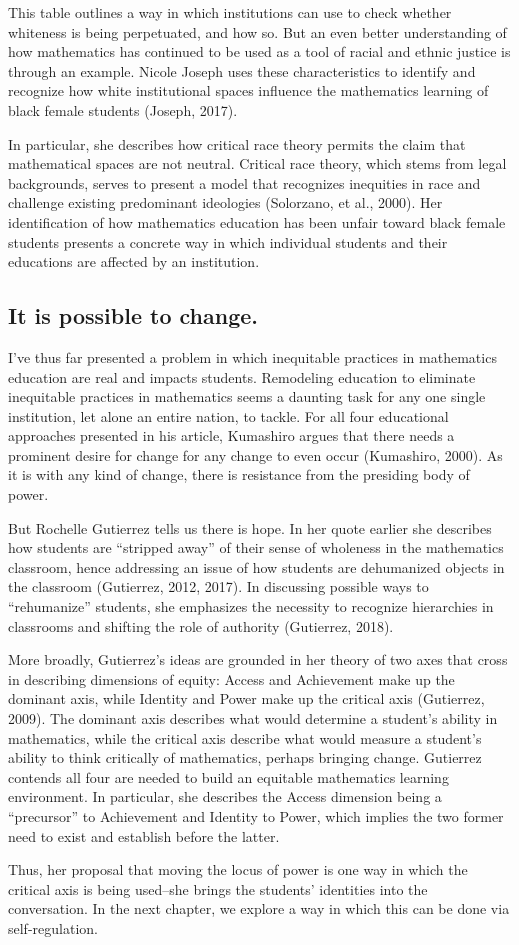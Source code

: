 This table outlines a way in which institutions can use to check whether whiteness is being perpetuated, and how so. But an even better understanding of how mathematics has continued to be used as a tool of racial and ethnic justice is through an example. Nicole Joseph uses these characteristics to identify and recognize how white institutional spaces influence the mathematics learning of black female students (Joseph, 2017).

In particular, she describes how critical race theory permits the claim that mathematical spaces are not neutral. Critical race theory, which stems from legal backgrounds, serves to present a model that recognizes inequities in race and challenge existing predominant ideologies (Solorzano, et al., 2000). Her identification of how mathematics education has been unfair toward black female students presents a concrete way in which individual students and their educations are affected by an institution.

\subsection{It is possible to change.}
I've thus far presented a problem in which inequitable practices in mathematics education are real and impacts students. Remodeling education to eliminate inequitable practices in mathematics seems a daunting task for any one single institution, let alone an entire nation, to tackle. For all four educational approaches presented in his article, Kumashiro argues that there needs a prominent desire for change for any change to even occur (Kumashiro, 2000). As it is with any kind of change, there is resistance from the presiding body of power.

But Rochelle Gutierrez tells us there is hope. In her quote earlier she describes how students are ``stripped away'' of their sense of wholeness in the mathematics classroom, hence addressing an issue of how students are dehumanized objects in the classroom (Gutierrez, 2012, 2017). In discussing possible ways to ``rehumanize'' students, she emphasizes the necessity to recognize hierarchies in classrooms and shifting the role of authority (Gutierrez, 2018).

More broadly, Gutierrez's ideas are grounded in her theory of two axes that cross in describing dimensions of equity: Access and Achievement make up the dominant axis, while Identity and Power make up the critical axis (Gutierrez, 2009). The dominant axis describes what would determine a student's ability in mathematics, while the critical axis describe what would measure a student's ability to think critically of mathematics, perhaps bringing change. Gutierrez contends all four are needed to build an equitable mathematics learning environment. In particular, she describes the Access dimension being a ``precursor'' to Achievement and Identity to Power, which implies the two former need to exist and establish before the latter.

Thus, her proposal that moving the locus of power is one way in which the critical axis is being used--she brings the students' identities into the conversation. In the next chapter, we explore a way in which this can be done via self-regulation.
